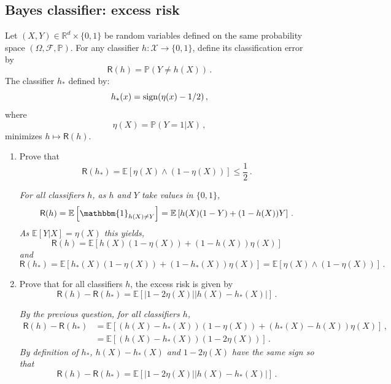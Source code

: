 \documentclass[a4paper,10pt,fleqn]{article}
\newcommand{\eqsp}{\,}
\newcommand{\calF}{\mathcal{F}}
\newcommand{\rset}{\ensuremath{\mathbb{R}}}
\newcommand{\bP}{\mathbb{P}}
\newcommand{\1}{\ensuremath{\mathbbm{1}}}
\begin{document}
\subsection{Bayes classifier: excess risk}
Let $(X,Y)\in\rset^d\times\{0,1\}$ be random variables defined on the same probability space $(\Omega,\calF,\bP)$.
For any classifier $h:\mathcal{X}\to \{0,1\}$, define its classification error by
$$
\mathsf{R}(h)=\bP(Y\neq h(X))\eqsp.
$$
The classifier $h_*$ defined by:
$$
h_{*}(x)={\rm sign}(\eta(x)-1/2)\eqsp,
$$
where
$$
\eta(X) = \bP(Y=1|X)\eqsp,
$$
minimizes $h\mapsto \mathsf{R}(h)$.
\begin{enumerate}
\item Prove that 
$$
\mathsf{R}(h_*) = \mathbb{E}\left[\eta(X) \wedge (1-\eta(X))\right]\leqslant \frac{1}{2}\eqsp.
$$

\vspace{.2cm}

{\em
For all classifiers $h$, as $h$ and $Y$ take values in $\{0,1\}$,
$$
\mathsf{R}(h) = \mathbb{E}\left[\1_{h(X)\neq Y}\right] = \mathbb{E}\left[h(X)(1-Y) + (1-h(X))Y\right]\eqsp.
$$
As $\mathbb{E}[Y|X] = \eta(X)$ this yields,
$$
\mathsf{R}(h) = \mathbb{E}\left[h(X)(1-\eta(X)) + (1-h(X))\eta(X)\right]
$$
and 
$$
\mathsf{R}(h_*) = \mathbb{E}\left[h_*(X)(1-\eta(X)) + (1-h_*(X))\eta(X)\right] =  \mathbb{E}\left[\eta(X) \wedge (1-\eta(X))\right]\eqsp.
$$
}
\item Prove that for all classifiers $h$, the excess risk is given by
$$
\mathsf{R}(h)  - \mathsf{R}(h_*) = \mathbb{E}\left[\left|1-2\eta(X)\right|\left|h(X) - h_*(X)\right|\right]\eqsp.
$$

\vspace{.2cm}

{\em
By the previous question, for all classifiers $h$,
\begin{align*}
\mathsf{R}(h)  - \mathsf{R}(h_*) &= \mathbb{E}\left[(h(X) - h_*(X))(1-\eta(X)) + (h_*(X)-h(X))\eta(X)\right]\eqsp,\\
 &= \mathbb{E}\left[(h(X) - h_*(X))(1-2\eta(X))\right]\eqsp.
\end{align*}
By definition of $h_*$, $h(X) - h_*(X)$ and $1-2\eta(X)$ have the same sign so that
$$
\mathsf{R}(h)  - \mathsf{R}(h_*) = \mathbb{E}\left[\left|1-2\eta(X)\right|\left|h(X) - h_*(X)\right|\right]\eqsp.
$$
}
\end{enumerate}
\end{document}

